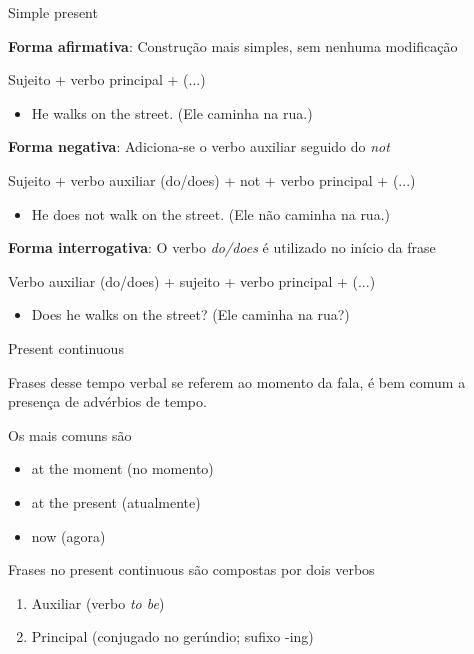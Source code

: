 \documentclass[compress,mathserif,xcolor=table]{beamer}
\begin{document}
\begin{frame}{Simple present}

\textbf{Forma afirmativa}: Construção mais simples, sem nenhuma modificação

Sujeito + verbo principal + (...)
\begin{itemize}
    \item He walks on the street. (Ele caminha na rua.)
\end{itemize}

\vspace{0.25cm}

\textbf{Forma negativa}: Adiciona-se o verbo auxiliar seguido do \textit{not}

Sujeito + verbo auxiliar (do/does) + not + verbo principal + (...)
\begin{itemize}
    \item He does not walk on the street. (Ele não caminha na rua.)
\end{itemize}

\vspace{0.25cm}

\textbf{Forma interrogativa}: O verbo \textit{do/does} é utilizado no início da frase

Verbo auxiliar (do/does) + sujeito + verbo principal + (...)
\begin{itemize}
    \item Does he walks on the street? (Ele caminha na rua?)
\end{itemize}

\end{frame}




\begin{frame}{Present continuous}

Frases desse tempo verbal se referem ao momento da fala, é bem comum a presença de advérbios de tempo. 

Os mais comuns são

\begin{itemize}
    \item at the moment (no momento)
    \item at the present (atualmente) 
    \item now (agora)
\end{itemize}

\vspace{0.5cm}

Frases no present continuous são compostas por dois verbos
\begin{enumerate}
    \item Auxiliar (verbo \textit{to be})
    \item Principal (conjugado no gerúndio; sufixo -ing)
\end{enumerate}

\end{frame}
\end{document}
